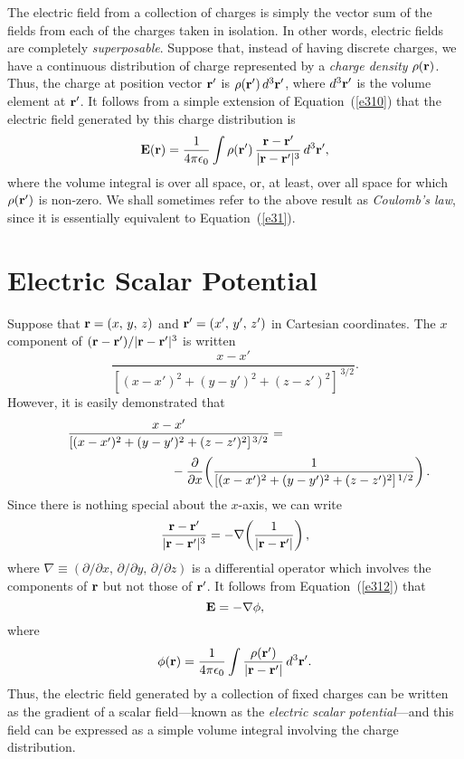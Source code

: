 The electric 
field from a collection of charges is 
simply the vector sum of the fields
from each of the charges taken in isolation. In other words, electric fields are 
completely {\em superposable}. Suppose that, instead of having discrete charges, we 
have a continuous distribution of charge represented by a {\em charge density}\/
$\rho({\bf r})$. Thus, the charge at position vector ${\bf r}'$ is
$\rho({\bf r}')\,d^3{\bf r}'$, where $d^3{\bf r}'$ is the volume element
at ${\bf r}'$. It follows from a simple extension of Equation~(\ref{e310}) that the electric
field generated by this charge distribution is
\begin{equation}\label{e312}
{\bf E}({\bf r}) =\frac{1}{4\pi\epsilon_0}
 \int \rho({\bf r}')\, \frac{{\bf r}- {\bf r}' }
{|{\bf r} - {\bf r}'|^3} \,d^3{\bf r}',
\end{equation}
where the volume integral is over all space, or, at least, over all space for which
$\rho({\bf r}')$ is non-zero. We shall sometimes refer to the above result
as {\em Coulomb's law}, since it is essentially equivalent to Equation~(\ref{e31}).

\section{Electric  Scalar Potential}
Suppose that ${\bf r} = (x,\,y,\,z)$ and ${\bf r'}= (x',\,y',\,z')$ in Cartesian coordinates.
The $x$ component of $({\bf r} - {\bf r'})/{|{\bf r} - {\bf r'}|^3}$ is
written
\begin{equation}
\frac{x - x'}{[(x-x')^2+(y-y')^2 + (z-z')^2]^{\,3/2}}.
\end{equation}
However, it is easily demonstrated that
\begin{eqnarray}
\frac{x - x'}{[(x-x')^2+(y-y')^2 + (z-z')^2]^{\,3/2}} = \mbox{\hspace{4cm}}
&&\\[0.5ex]
\mbox{\hspace{4cm}}-\frac{\partial}{\partial x}\!\left(
\frac{1}{[(x-x')^2+(y-y')^2 + (z-z')^2]^{\,1/2}}\right).&&\nonumber
\end{eqnarray}
Since there is nothing special about the $x$-axis, we can write
\begin{equation}\label{e315}
\frac{{\bf r}- {\bf r}' }
{|{\bf r} - {\bf r}'|^3} = -\nabla\!\left(\frac{1}{|{\bf r} - {\bf r'}|}\right),
\end{equation}
where $\nabla\equiv (\partial/\partial x,\,\partial/\partial y, \,
\partial/\partial z)$
is a differential operator which involves the components of ${\bf r}$ but not
those of ${\bf r}'$. 
It follows from Equation~(\ref{e312}) that
\begin{equation}\label{e316}
{\bf E} = -\nabla \phi,
\end{equation}
where
\begin{equation}\label{e317}
\phi({\bf r}) = \frac{1}{4\pi\epsilon_0}
\int \frac{ \rho({\bf r}')}{|{\bf r} - {\bf r}'|} \,d^3{\bf r}'.
\end{equation}
Thus, the electric field generated by a collection of fixed charges can be written
as the gradient of a scalar field---known as the {\em electric scalar potential}---and this field can be expressed as a
simple volume integral involving the charge distribution.

